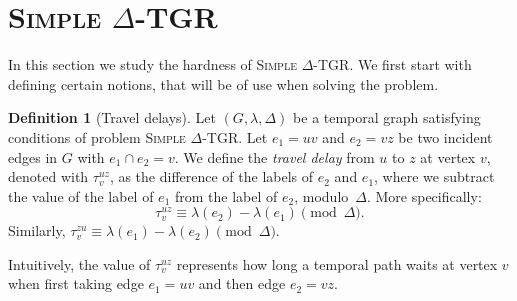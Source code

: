 \documentclass[11pt,a4paper]{article}
\theoremstyle{remark}
\theoremstyle{definition}
\newtheorem{definition}[theorem]{Definition}
\newcommand{\deltaExact}{\textsc{Simple $\Delta$-TGR}}
\begin{document}

\section{
\texorpdfstring{\deltaExact\ } {Simple Delta-TGR}}

In this section we study the hardness of \deltaExact. We first start with defining certain notions, that will be of use when solving the problem.

    \begin{definition}[Travel delays]
    Let $(G, \lambda, \Delta)$ be a temporal graph satisfying conditions of problem \deltaExact.
    Let $e_1=uv$ and $e_2=vz$ be two incident edges in $G$ with $e_1 \cap e_2 = v$.
    We define the \emph{travel delay} from $u$ to $z$ at vertex $v$, denoted with $\tau_v^{uz}$,
    as the difference of the labels of $e_2$ and $e_1$, where we subtract the value of the label of $e_1$ from the label of $e_2$,  modulo~$\Delta$.
    More specifically:
    \begin{equation}\label{eq:def-VertexWaitingTime}
       \tau_v^{uz} \equiv \lambda (e_2) - \lambda(e_1) \pmod \Delta.
    \end{equation}
    Similarly, $\tau_v^{zu} \equiv \lambda (e_1) - \lambda(e_2) \pmod \Delta$.
    \end{definition}
    Intuitively, the value of $\tau_v^{uz}$ represents how long a temporal path waits at vertex $v$ when first taking edge $e_1=uv$ and then edge $e_2 = vz$.
\end{document}
